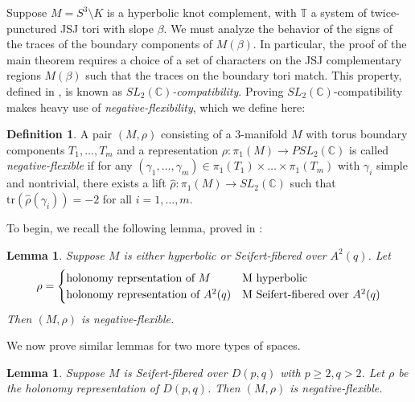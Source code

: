 \documentclass{article}
\theoremstyle{plain}
\theoremstyle{definition}
\newtheorem{definition}[theorem]{Definition}
\theoremstyle{plain}
\theoremstyle{plain}
\theoremstyle{plain}
\newtheorem{lemma}[theorem]{Lemma}
\theoremstyle{remark}
\theoremstyle{remark}
\theoremstyle{plain}
\theoremstyle{plain}
\begin{document}
Suppose $M = S^3 \setminus K$ is a hyperbolic knot complement, with $\mathbb{T}$ a system of twice-punctured JSJ tori with slope $\beta$. We must analyze the behavior of the signs of the traces of the boundary components of $M(\beta)$. In particular, the proof of the main theorem requires a choice of a set of characters on the JSJ complementary regions $M(\beta)$ such that the traces on the boundary tori match. This property, defined in \cite{Wang}, is known as \emph{$SL_2(\mathbb{C})$-compatibility}. Proving $SL_2(\mathbb{C})$-compatibility makes heavy use of \emph{negative-flexibility}, which we define here: 

\begin{definition}
A pair $(M, \rho)$ consisting of a 3-manifold $M$ with torus boundary components $T_1, \dots, T_m$ and a representation $\rho: \pi_1(M) \to PSL_2(\mathbb{C})$ is called \emph{negative-flexible} if for any $(\gamma_1, \dots, \gamma_m) \in \pi_1(T_1) \times \dots \times \pi_1(T_m)$ with $\gamma_i$ simple and nontrivial, there exists a lift $\hat{\rho}: \pi_1(M) \to SL_2(\mathbb{C})$ such that $\text{tr}(\hat{\rho}(\gamma_i)) = -2$ for all $i = 1, \dots, m$. 
\end{definition}

To begin, we recall the following lemma, proved in \cite{Wang}:

\begin{lemma}\label{lma:hyperbolicandannulus}
Suppose $M$ is either hyperbolic or Seifert-fibered over $A^2(q)$. Let 
\begin{equation}
	\rho = \begin{cases}
		\text{holonomy reprsentation of } M & $M$ \text{ hyperbolic} \\ \text{holonomy representation of } A^2(q) & $M$ \text{ Seifert-fibered over } A^2(q)
	\end{cases}
\end{equation}
Then $(M, \rho)$ is negative-flexible. 
\end{lemma}

We now prove similar lemmas for two more types of spaces.

\begin{lemma}\label{lma:disknegative}
Suppose $M$ is Seifert-fibered over $D(p, q)$ with $p \geq 2, q > 2$. Let $\rho$ be the holonomy representation of $D(p, q)$. Then $(M, \rho)$ is negative-flexible.
\end{lemma}
\end{document}
